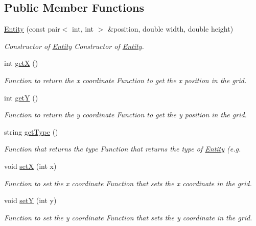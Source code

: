 \subsection*{Public Member Functions}
\begin{DoxyCompactItemize}
\item 
\hyperlink{classGameLogic_1_1Entity_ace7cd95750149d125c00bb7786527cbf}{Entity} (const pair$<$ int, int $>$ \&position, double width, double height)
\begin{DoxyCompactList}\small\item\em Constructor of \hyperlink{classGameLogic_1_1Entity}{Entity} Constructor of \hyperlink{classGameLogic_1_1Entity}{Entity}. \end{DoxyCompactList}\item 
int \hyperlink{classGameLogic_1_1Entity_a1d7c4fa1af58df883ae751c4e536c25d}{getX} ()
\begin{DoxyCompactList}\small\item\em Function to return the x coordinate Function to get the x position in the grid. \end{DoxyCompactList}\item 
int \hyperlink{classGameLogic_1_1Entity_a24a56a7da02136fd662b72b04fcf6c30}{getY} ()
\begin{DoxyCompactList}\small\item\em Function to return the y coordinate Function to get the y position in the grid. \end{DoxyCompactList}\item 
string \hyperlink{classGameLogic_1_1Entity_a8bdd4210279142027ba149483b89ff01}{get\+Type} ()
\begin{DoxyCompactList}\small\item\em Function that returns the type Function that returns the type of \hyperlink{classGameLogic_1_1Entity}{Entity} (e.\+g. \end{DoxyCompactList}\item 
void \hyperlink{classGameLogic_1_1Entity_a570383f8bb12fc3185d136289f2149c8}{setX} (int x)
\begin{DoxyCompactList}\small\item\em Function to set the x coordinate Function that sets the x coordinate in the grid. \end{DoxyCompactList}\item 
void \hyperlink{classGameLogic_1_1Entity_a246c3603f576c080df17978b483ada45}{setY} (int y)
\begin{DoxyCompactList}\small\item\em Function to set the y coordinate Function that sets the y coordinate in the grid. \end{DoxyCompactList}\item 

\end{DoxyCompactItemize}
